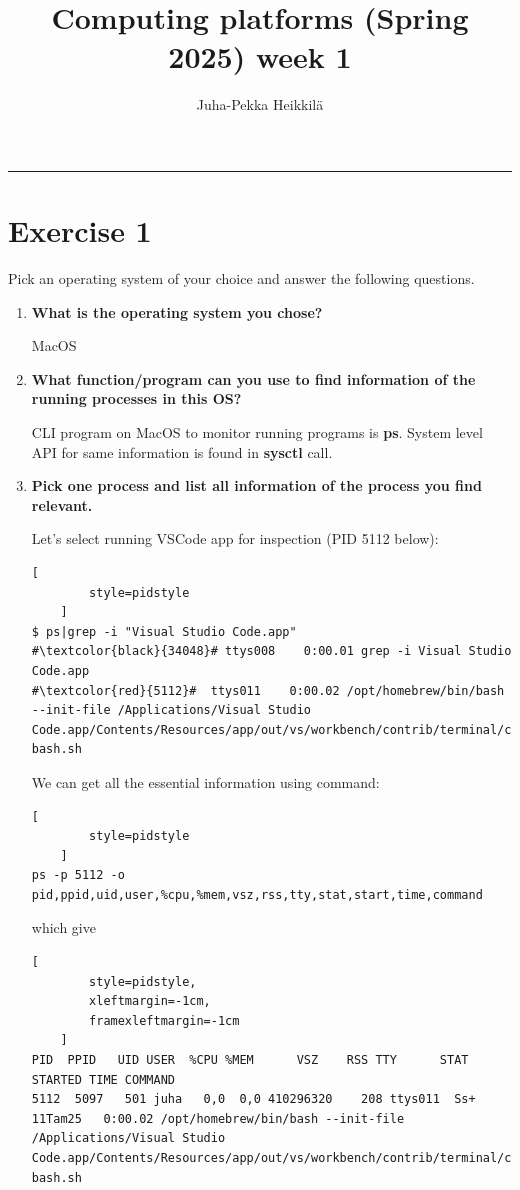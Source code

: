 \documentclass{article}
\title{Computing platforms (Spring 2025)\newline
week 1}
\author{Juha-Pekka Heikkilä}
\renewcommand{\maketitle}{%
  \begin{leftmark}
    \vspace*{\baselineskip} %



    \textbf{\fontsize{18}{36}\selectfont \thetitle} %

     \vspace{0.05cm} %
    \vspace{\baselineskip} %
     \rule{\textwidth}{0.4pt} %

   \end{leftmark}
}
\newcommand{\exercise}[1]{
    \section*{Exercise #1}
    \markboth{Exercise #1}{}
}
\begin{document}
\maketitle


\exercise{1}
Pick an operating system of your choice and answer the following questions.
\begin{enumerate}[label=\textbf{\alph*})]
    \item {\bf What is the operating system you chose?}
    
    MacOS
    \item {\bf What function/program can you use to find
    information of the running processes in this OS?}
    
    CLI program on MacOS to monitor running programs is {\bf ps}.
    System level API for same information is found in {\bf sysctl} call.
\pagebreak
    \item {\bf Pick one process and list all information of
    the process you find relevant.}
    
    Let's select running VSCode app for inspection (PID 5112 below):

    \begin{lstlisting}[
        style=pidstyle
    ]
$ ps|grep -i "Visual Studio Code.app"
#\textcolor{black}{34048}# ttys008    0:00.01 grep -i Visual Studio Code.app
#\textcolor{red}{5112}#  ttys011    0:00.02 /opt/homebrew/bin/bash --init-file /Applications/Visual Studio Code.app/Contents/Resources/app/out/vs/workbench/contrib/terminal/common/scripts/shellIntegration-bash.sh
    \end{lstlisting}

    We can get all the essential information using command:
    \begin{lstlisting}[
        style=pidstyle
    ]
ps -p 5112 -o pid,ppid,uid,user,%cpu,%mem,vsz,rss,tty,stat,start,time,command
    \end{lstlisting}
    which give
    \begin{lstlisting}[
        style=pidstyle,
        xleftmargin=-1cm,
        framexleftmargin=-1cm
    ]
PID  PPID   UID USER  %CPU %MEM      VSZ    RSS TTY      STAT STARTED TIME COMMAND
5112  5097   501 juha   0,0  0,0 410296320    208 ttys011  Ss+  11Tam25   0:00.02 /opt/homebrew/bin/bash --init-file /Applications/Visual Studio Code.app/Contents/Resources/app/out/vs/workbench/contrib/terminal/common/scripts/shellIntegration-bash.sh
    \end{lstlisting}


\end{enumerate}
\end{document}
